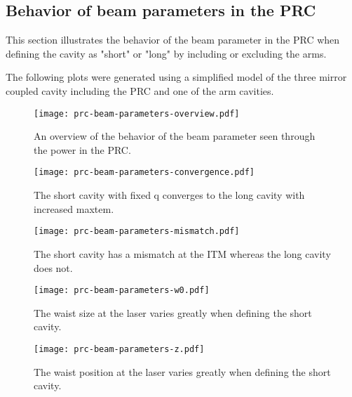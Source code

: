 \documentclass[color,DIV12,pdftex,a4paper]{virgo-note}
\begin{document}
\subsection{Behavior of beam parameters in the PRC}

This section illustrates the behavior of the beam parameter in the PRC when defining the cavity as "short" or "long" by including or excluding the arms.

The following plots were generated using a simplified model of the three mirror coupled cavity including the PRC and one of the arm cavities.

\begin{figure}[h!]
  \centering
  \texttt{[image: prc-beam-parameters-overview.pdf]}
  \caption{An overview of the behavior of the beam parameter seen through the power in the PRC.}
  \label{fig:prc-q-overview}
\end{figure}

\begin{figure}[h!]
  \centering
  \texttt{[image: prc-beam-parameters-convergence.pdf]}
  \caption{The short cavity with fixed q converges to the long cavity with increased maxtem.}
  \label{fig:prc-q-convergence}
\end{figure}

\begin{figure}[h!]
  \centering
  \texttt{[image: prc-beam-parameters-mismatch.pdf]}
  \caption{The short cavity has a mismatch at the ITM whereas the long cavity does not.}
  \label{fig:prc-itm-mismatch}
\end{figure}

\begin{figure}[h!]
  \centering
  \texttt{[image: prc-beam-parameters-w0.pdf]}
  \caption{The waist size at the laser varies greatly when defining the short cavity.}
  \label{fig:prc-laser-w0}
\end{figure}

\begin{figure}[h!]
  \centering
  \texttt{[image: prc-beam-parameters-z.pdf]}
  \caption{The waist position at the laser varies greatly when defining the short cavity.}
  \label{fig:prc-laser-z}
\end{figure}




\end{document}
